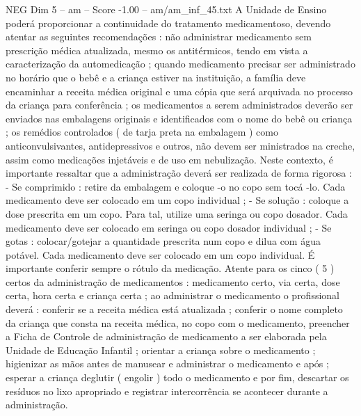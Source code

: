 \begin{textsample}{NEG Dim 5 – am – Score -1.00 – am/am\_inf\_45.txt}
A Unidade de Ensino poderá proporcionar a continuidade do tratamento medicamentoso, devendo atentar as seguintes recomendações : não administrar medicamento sem prescrição médica atualizada, mesmo os antitérmicos, tendo em vista a caracterização da automedicação ; quando medicamento precisar ser administrado no horário que o bebê e a criança estiver na instituição, a família deve encaminhar a receita médica original e uma cópia que será arquivada no processo da criança para conferência ; os medicamentos a serem administrados deverão ser enviados nas embalagens originais e identificados com o nome do bebê ou criança ; os remédios controlados ( de tarja preta na embalagem ) como anticonvulsivantes, antidepressivos e outros, não devem ser ministrados na creche, assim como medicações injetáveis e de uso em nebulização.
Neste contexto, é importante ressaltar que a administração deverá ser realizada de forma rigorosa : - Se comprimido : retire da embalagem e coloque -o no copo sem tocá -lo.
Cada medicamento deve ser colocado em um copo individual ; - Se solução : coloque a dose prescrita em um copo.
Para tal, utilize uma seringa ou copo dosador.
Cada medicamento deve ser colocado em seringa ou copo dosador individual ; - Se gotas : colocar/gotejar a quantidade prescrita num copo e dilua com água potável.
Cada medicamento deve ser colocado em um copo individual.
É importante conferir sempre o rótulo da medicação.
Atente para os cinco ( 5 ) certos da administração de medicamentos : medicamento certo, via certa, dose certa, hora certa e criança certa ; ao administrar o medicamento o profissional deverá : conferir se a receita médica está atualizada ; conferir o nome completo da criança que consta na receita médica, no copo com o medicamento, preencher a Ficha de Controle de administração de medicamento a ser elaborada pela Unidade de Educação Infantil ; orientar a criança sobre o medicamento ; higienizar as mãos antes de manusear e administrar o medicamento e após ; esperar a criança deglutir ( engolir ) todo o medicamento e por fim, descartar os resíduos no lixo apropriado e registrar intercorrência se acontecer durante a administração.

\end{textsample}
